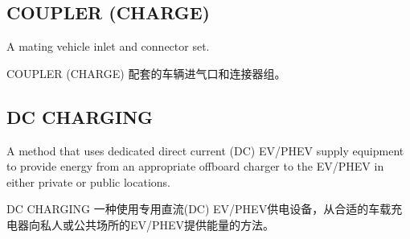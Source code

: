         \subsection*{COUPLER (CHARGE)}
        \label{def9}
        A mating vehicle inlet and connector set.
        \begin{definition}{COUPLER (CHARGE)}
        配套的车辆进气口和连接器组。
        \end{definition}
        
        \subsection*{DC CHARGING}
        \label{def10}
        A method that uses dedicated direct current (DC) EV/PHEV supply equipment to provide energy from an appropriate offboard charger to the EV/PHEV in either private or public locations.
        \begin{definition}{DC CHARGING}
        一种使用专用直流(DC) EV/PHEV供电设备，从合适的车载充电器向私人或公共场所的EV/PHEV提供能量的方法。
        \end{definition}
        
